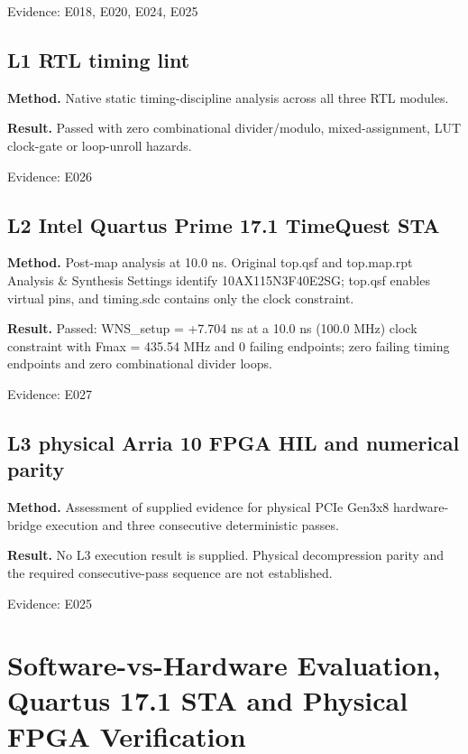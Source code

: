 \documentclass[11pt,a4paper]{article}
\begin{document}
{\small Evidence: E018,\allowbreak{} E020,\allowbreak{} E024,\allowbreak{} E025}

\subsection{L1 RTL timing lint}

\textbf{Method.} Native static timing-discipline analysis across all three RTL modules.

\textbf{Result.} Passed with zero combinational divider/\allowbreak{}modulo,\allowbreak{} mixed-assignment,\allowbreak{} LUT clock-gate or loop-unroll hazards.

{\small Evidence: E026}

\subsection{L2 Intel Quartus Prime 17.1 TimeQuest STA}

\textbf{Method.} Post-map analysis at 10.0 ns. Original top.qsf and top.map.rpt Analysis \& Synthesis Settings identify 10AX115N3F40E2SG; top.qsf enables virtual pins,\allowbreak{} and timing.sdc contains only the clock constraint.

\textbf{Result.} Passed: WNS\_\allowbreak{}setup =\allowbreak{} +\allowbreak{}7.704 ns at a 10.0 ns (\allowbreak{}100.0 MHz)\allowbreak{} clock constraint with Fmax =\allowbreak{} 435.54 MHz and 0 failing endpoints; zero failing timing endpoints and zero combinational divider loops.

{\small Evidence: E027}

\subsection{L3 physical Arria 10 FPGA HIL and numerical parity}

\textbf{Method.} Assessment of supplied evidence for physical PCIe Gen3x8 hardware-bridge execution and three consecutive deterministic passes.

\textbf{Result.} No L3 execution result is supplied. Physical decompression parity and the required consecutive-pass sequence are not established.

{\small Evidence: E025}

\section{Software-vs-Hardware Evaluation, Quartus 17.1 STA and Physical FPGA Verification}
\end{document}
